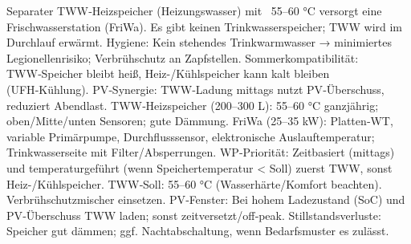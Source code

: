 \markdownRendererDocumentBegin
\markdownRendererSectionBegin
{}\markdownRendererInterblockSeparator
{}Separater TWW‑Heizspeicher (Heizungswasser) mit ~55–60 °C versorgt eine Frischwasserstation (FriWa). Es gibt keinen Trinkwasserspeicher; TWW wird im Durchlauf erwärmt.\markdownRendererInterblockSeparator
{}\markdownRendererSectionBegin
{}\markdownRendererInterblockSeparator
{}\markdownRendererUlBeginTight
\markdownRendererUlItem Hygiene: Kein stehendes Trinkwarmwasser → minimiertes Legionellenrisiko; Verbrühschutz an Zapfstellen.\markdownRendererUlItemEnd 
\markdownRendererUlItem Sommerkompatibilität: TWW‑Speicher bleibt heiß, Heiz-/Kühlspeicher kann kalt bleiben (UFH‑Kühlung).\markdownRendererUlItemEnd 
\markdownRendererUlItem PV‑Synergie: TWW‑Ladung mittags nutzt PV‑Überschuss, reduziert Abendlast.\markdownRendererUlItemEnd 
\markdownRendererUlEndTight \markdownRendererInterblockSeparator
{}
\markdownRendererSectionEnd \markdownRendererSectionBegin
{}\markdownRendererInterblockSeparator
{}\markdownRendererUlBeginTight
\markdownRendererUlItem TWW‑Heizspeicher (200–300 L): 55–60 °C ganzjährig; oben/Mitte/unten Sensoren; gute Dämmung.\markdownRendererUlItemEnd 
\markdownRendererUlItem FriWa (25–35 kW): Platten‑WT, variable Primärpumpe, Durchflusssensor, elektronische Auslauftemperatur; Trinkwasserseite mit Filter/Absperrungen.\markdownRendererUlItemEnd 
\markdownRendererUlItem WP‑Priorität: Zeitbasiert (mittags) und temperaturgeführt (wenn Speichertemperatur < Soll) zuerst TWW, sonst Heiz-/Kühlspeicher.\markdownRendererUlItemEnd 
\markdownRendererUlEndTight \markdownRendererInterblockSeparator
{}
\markdownRendererSectionEnd \markdownRendererSectionBegin
{}\markdownRendererInterblockSeparator
{}\markdownRendererUlBeginTight
\markdownRendererUlItem TWW‑Soll: 55–60 °C (Wasserhärte/Komfort beachten). Verbrühschutzmischer einsetzen.\markdownRendererUlItemEnd 
\markdownRendererUlItem PV‑Fenster: Bei hohem Ladezustand (SoC) und PV‑Überschuss TWW laden; sonst zeitversetzt/off‑peak.\markdownRendererUlItemEnd 
\markdownRendererUlItem Stillstandsverluste: Speicher gut dämmen; ggf. Nachtabschaltung, wenn Bedarfsmuster es zulässt.\markdownRendererUlItemEnd 
\markdownRendererUlEndTight \markdownRendererInterblockSeparator
{}
\markdownRendererSectionEnd \markdownRendererSectionBegin
{}\markdownRendererInterblockSeparator
{}\markdownRendererUlBeginTight
